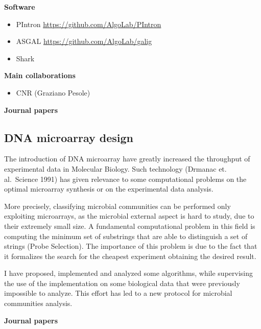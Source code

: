 \documentclass[11pt,a4paper,roman]{moderncv}
\begin{document}
\textbf{Software}

\begin{itemize}
	\item
	      PIntron \url{https://github.com/AlgoLab/PIntron}
	\item
	      ASGAL \url{https://github.com/AlgoLab/galig}
	\item
	      Shark
\end{itemize}



\textbf{Main collaborations}

\begin{itemize}
	\item
	      CNR (Graziano Pesole)
\end{itemize}

\textbf{Journal papers}

\cite{DBLP:journals/bioinformatics/DentiPPCVRB21}
\cite{DBLP:journals/bmcbi/DentiRBVPB18} \cite{DBLP:journals/jcb/BerettaBVPR14} \cite{DBLP:journals/bmcbi/PirolaRPPVB12}


\subsection{DNA microarray design}\label{dna-microarray-design}

The introduction of DNA microarray have greatly increased the throughput
of experimental data in Molecular Biology. Such technology (Drmanac et.
al.~Science 1991) has given relevance to some computational problems on
the optimal microarray synthesis or on the experimental data analysis.

More precisely, classifying microbial communities can be performed only
exploiting microarrays, as the microbial external aspect is hard to
study, due to their extremely small size. A fundamental computational
problem in this field is computing the minimum set of substrings that
are able to distinguish a set of strings (Probe Selection). The
importance of this problem is due to the fact that it formalizes the
search for the cheapest experiment obtaining the desired result.

I have proposed, implemented and analyzed some algorithms, while
supervising the use of the implementation on some biological data that
were previously impossible to analyze. This effort has led to a new
protocol for microbial communities analysis.

\textbf{Journal  papers}

\cite{DBLP:journals/bmcbi/RueggerVJB11}
\cite{valinskyAnalysisBacterialCommunity2002}
\cite{valinskyOligonucleotideFingerprintingRRNA2002}
\cite{bornemanProbeSelectionAlgorithms2001}
\end{document}
